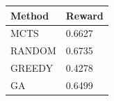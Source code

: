 \begin{tabular}{ll}
\hline
Method & Reward \\
\hline
  MCTS & 0.6627 \\
  RANDOM & 0.6735 \\
  GREEDY & 0.4278 \\
  GA & 0.6499 \\
\hline
\end{tabular}
